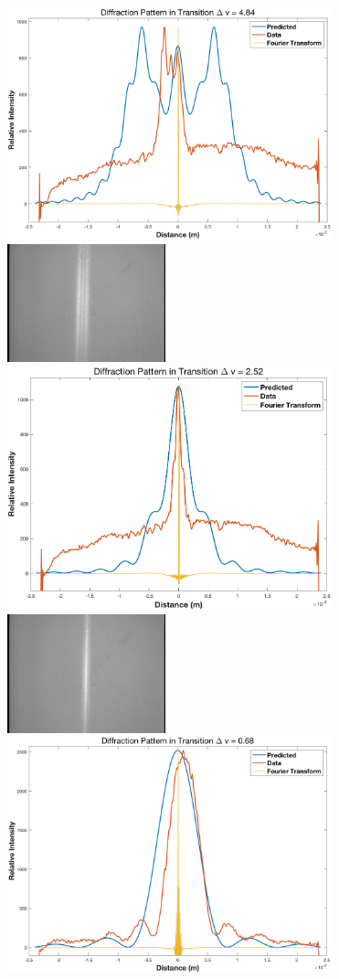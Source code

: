 \documentclass[11pt]{article}
\begin{document}
\begin{center}
	\begin{figure}[H]
	\centering
	\includegraphics[width=3.7in]{"Final Figures/Figure1"}
	\includegraphics[width=1.8in]{"Final Figures/Figure1Raw"}
	\includegraphics[width=3.7in]{"Final Figures/Figure2"}
	\includegraphics[width=1.8in]{"Final Figures/Figure2Raw"}
	\includegraphics[width=3.7in]{"Final Figures/Figure3"}

\end{figure}
\end{center}
\end{document}

